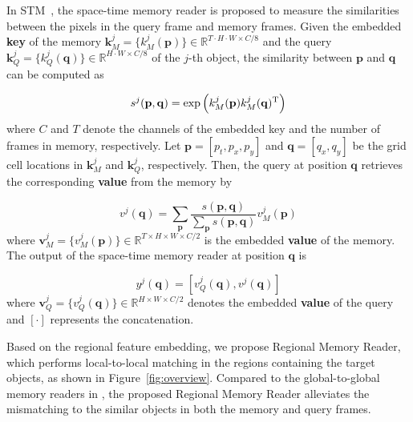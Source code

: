 \documentclass[final]{cvpr}
\begin{document}
In STM~\cite{DBLP:conf/iccv/OhLXK19}, the space-time memory reader is proposed to measure the similarities between the pixels in the query frame and memory frames.
Given the embedded \textbf{key} of the memory $\mathbf{k}_M^j = \{k_M^j(\mathbf{p})\} \in \mathbb{R}^{T \cdot H \cdot W \times C / 8}$ and the query $\mathbf{k}_Q^j = \{k_Q^j(\mathbf{q})\} \in \mathbb{R}^{H \cdot W \times C / 8}$ of the $j$-th object, the similarity between $\mathbf{p}$ and $\mathbf{q}$ can be computed as 

\begin{equation}
  s^j(\mathbf{p}, \mathbf{q}) = \exp \left( k_M^j(\mathbf{p}) k_M^j(\mathbf{q})^{\rm T} \right)
\end{equation}
where $C$ and $T$ denote the channels of the embedded key and the number of frames in memory, respectively.
Let $\mathbf{p} = [p_t, p_x, p_y]$ and $\mathbf{q} = [q_x, q_y]$ be the grid cell locations in $\mathbf{k}_M^j$ and $\mathbf{k}_Q^j$, respectively.
Then, the query at position $\mathbf{q}$ retrieves the corresponding \textbf{value} from the memory by

\begin{equation}
  v^j(\mathbf{q}) = \sum_\mathbf{p} \frac{s(\mathbf{p}, \mathbf{q})}{\sum_\mathbf{p} s(\mathbf{p}, \mathbf{q})} v_M^j(\mathbf{p})
\end{equation}
where $\mathbf{v}_M^j = \{v_M^j(\mathbf{p})\} \in \mathbb{R}^{T \times H \times W \times C / 2}$ is the embedded \textbf{value} of the memory.
The output of the space-time memory reader at position $\mathbf{q}$ is

\begin{equation}
  y^j(\mathbf{q}) = \left[ v_Q^j(\mathbf{q}), v^j(\mathbf{q}) \right]
\end{equation}
where $\mathbf{v}_Q^j = \{v_Q^j(\mathbf{q})\} \in \mathbb{R}^{H \times W \times C / 2}$ denotes the embedded \textbf{value} of the query and $[\cdot]$ represents the concatenation.

Based on the regional feature embedding, we propose Regional Memory Reader, which performs local-to-local matching in the regions containing the target objects, as shown in Figure~\ref{fig:overview}.
Compared to the global-to-global memory readers in \cite{DBLP:conf/eccv/LuWDZSG20,DBLP:conf/cvpr/OhLXK19,DBLP:conf/eccv/SeongHK20}, the proposed Regional Memory Reader alleviates the mismatching  to the similar objects in both the memory and query frames.
\end{document}
